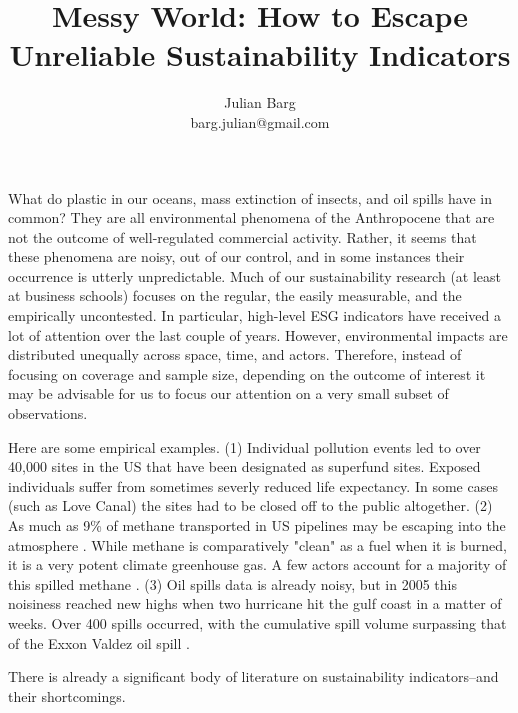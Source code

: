 \documentclass[12pt, man, natbib]{apa6}
\title{Messy World: How to Escape Unreliable Sustainability Indicators}
\author{Julian Barg\\barg.julian@gmail.com}
\affiliation{Ivey Business School}
\begin{document}
	
	\maketitle
	
	\singlespacing
	
	\section{}
	
	What do plastic in our oceans, mass extinction of insects, and oil spills have in common? They are all environmental phenomena of the Anthropocene that are not the outcome of well-regulated commercial activity. Rather, it seems that these phenomena are noisy, out of our control, and in some instances their occurrence is utterly unpredictable. Much of our sustainability research (at least at business schools) focuses on the regular, the easily measurable, and the empirically uncontested. In particular, high-level ESG indicators have received a lot of attention over the last couple of years. However, environmental impacts are distributed unequally across space, time, and actors. Therefore, instead of focusing on coverage and sample size, depending on the outcome of interest it may be advisable for us to focus our attention on a very small subset of observations.
	
	Here are some empirical examples. (1) Individual pollution events led to over 40,000 sites in the US that have been designated as superfund sites. Exposed individuals suffer from sometimes severly reduced life expectancy. In some cases (such as Love Canal) the sites had to be closed off to the public altogether. (2) As much as 9\% of methane transported in US pipelines may be escaping into the atmosphere \citep{Tollefson2013}. While methane is comparatively "clean" as a fuel when it is burned, it is a very potent climate greenhouse gas. A few actors account for a majority of this spilled methane \citep{Tollefson2013}. (3) Oil spills data is already noisy, but in 2005 this noisiness reached new highs when two hurricane hit the gulf coast in a matter of weeks. Over 400 spills occurred, with the cumulative spill volume surpassing that of the Exxon Valdez oil spill \citep{Cruz2009}.
	
	There is already a significant body of literature on sustainability indicators--and their shortcomings. 


\end{document}

